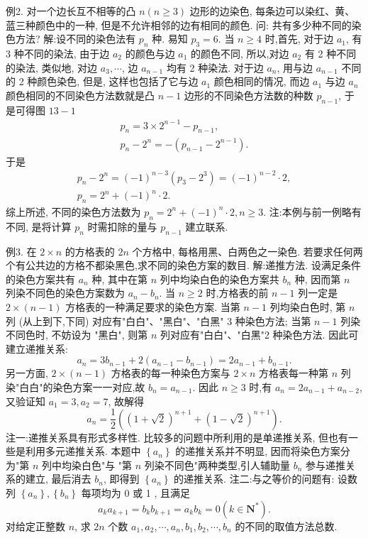 例2. 对一个边长互不相等的凸 $n(n \geqslant 3)$ 边形的边染色, 每条边可以染红、黄、蓝三种颜色中的一种, 但是不允许相邻的边有相同的颜色.
问: 共有多少种不同的染色方法?
解:设不同的染色法有 $p_n$ 种.
易知 $p_3=6$.
当 $n \geqslant 4$ 时,首先, 对于边 $a_1$, 有 3 种不同的染法, 由于边 $a_2$ 的颜色与边 $a_1$ 的颜色不同, 所以,对边 $a_2$ 有 2 种不同的染法, 类似地, 对边 $a_3, \cdots$, 边 $a_{n-1}$ 均有 2 种染法.
对于边 $a_n$, 用与边 $a_{n-1}$ 不同的 2 种颜色染色, 但是, 这样也包括了它与边 $a_1$ 颜色相同的情况, 而边 $a_1$ 与边 $a_n$ 颜色相同的不同染色方法数就是凸 $n-1$ 边形的不同染色方法数的种数 $p_{n-1}$, 于是可得图 $13-1$
$$
\begin{gathered}
p_n=3 \times 2^{n-1}-p_{n-1}, \\
p_n-2^n=-\left(p_{n-1}-2^{n-1}\right) .
\end{gathered}
$$
于是
$$
\begin{gathered}
p_n-2^n=(-1)^{n-3}\left(p_3-2^3\right)=(-1)^{n-2} \cdot 2, \\
p_n=2^n+(-1)^n \cdot 2 .
\end{gathered}
$$
综上所述, 不同的染色方法数为 $p_n=2^n+(-1)^n \cdot 2, n \geqslant 3$.
注:本例与前一例略有不同, 是将计算 $p_n$ 时需扣除的量与 $p_{n-1}$ 建立联系.



例3. 在 $2 \times n$ 的方格表的 $2 n$ 个方格中, 每格用黑、白两色之一染色.
若要求任何两个有公共边的方格不都染黑色,求不同的染色方案的数目.
解:递推方法.
设满足条件的染色方案共有 $a_n$ 种, 其中在第 $n$ 列中均染白色的染色方案共 $b_n$ 种, 因而第 $n$ 列染不同色的染色方案数为 $a_n-b_n$.
当 $n \geqslant 2$ 时,方格表的前 $n-1$ 列一定是 $2 \times(n-1)$ 方格表的一种满足要求的染色方案.
当第 $n-1$ 列均染白色时, 第 $n$ 列 (从上到下,下同) 对应有"白白"、"黑白"、"白黑" 3 种染色方法; 当第 $n-1$ 列染不同色时, 不妨设为 "黑白", 则第 $n$ 列对应有"白白"、"白黑"2 种染色方法.
因此可建立递推关系:
$$
a_n=3 b_{n-1}+2\left(a_{n-1}-b_{n-1}\right)=2 a_{n-1}+b_{n-1} .
$$
另一方面, $2 \times(n-1)$ 方格表的每一种染色方案与 $2 \times n$ 方格表每一种第 $n$ 列染"白白"的染色方案一一对应,故 $b_n=a_{n-1}$.
因此 $n \geqslant 3$ 时,有 $a_n=2 a_{n-1}+a_{n-2}$, 又验证知 $a_1=3, a_2=7$, 故解得
$$
a_n=\frac{1}{2}\left((1+\sqrt{2})^{n+1}+(1-\sqrt{2})^{n+1}\right) .
$$
注一:递推关系具有形式多样性.
比较多的问题中所利用的是单递推关系, 但也有一些是利用多元递推关系.
本题中 $\left\{a_n\right\}$ 的递推关系并不明显, 因而将染色方案分为"第 $n$ 列中均染白色"与 "第 $n$ 列染不同色"两种类型,引人辅助量 $b_n$ 参与递推关系的建立, 最后消去 $b_n$, 即得到 $\left\{a_n\right\}$ 的递推关系.
注二:与之等价的问题有:
设数列 $\left\{a_n\right\},\left\{b_n\right\}$ 每项均为 0 或 1 , 且满足
$$
a_k a_{k+1}=b_k b_{k+1}=a_k b_k=0\left(k \in \mathbf{N}^*\right) .
$$
对给定正整数 $n$, 求 $2 n$ 个数 $a_1, a_2, \cdots, a_n, b_1, b_2, \cdots, b_n$ 的不同的取值方法总数.



